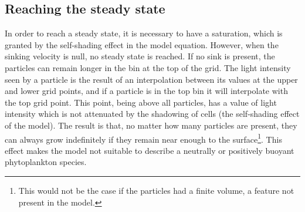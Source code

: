 \subsection{Reaching the steady state} \label{sec:lag_steady}
In order to reach a steady state, it is necessary to have a saturation, which is granted by the self-shading effect in the model equation. However, when the sinking velocity is null, no steady state is reached. If no sink is present, the particles can remain longer in the bin at the top of the grid. The light intensity seen by a particle is the result of an interpolation between its values at the upper and lower grid points, and if a particle is in the top bin it will interpolate with the top grid point. This point, being above all particles, has a value of light intensity which is not attenuated by the shadowing of cells (the self-shading effect of the model). The result is that, no matter how many particles are present, they can always grow indefinitely if they remain near enough to the surface\footnote{This would not be the case if the particles had a finite volume, a feature not present in the model.}. %
This effect makes the model not suitable to describe a neutrally or positively buoyant phytoplankton species.



